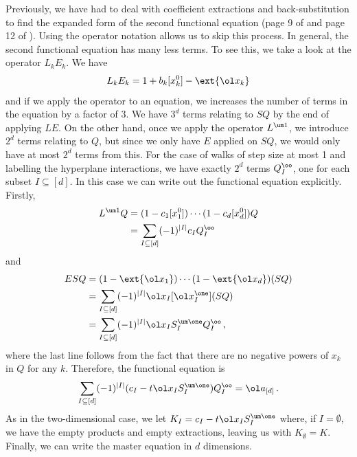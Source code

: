 Previously, we have had to deal with coefficient extractions and back-substitution to find the expanded form of the second functional equation (page 9 of \cite{tabbara2014exact} and page 12 of \cite{wong2014confining}). Using the operator notation allows us to skip this process. In general, the second functional equation has many less terms. To see this, we take a look at the operator $L_kE_k$. We have
\begin{align}
	L_kE_k = 1 + b_k[x_k^0]-\ext{\ol x_k}
\end{align}
and if we apply the operator to an equation, we increases the number of terms in the equation by a factor of 3. We have $3^d$ terms relating to $SQ$ by the end of applying $LE$. On the other hand, once we apply the operator $L^{\um 1}$, we introduce $2^d$ terms relating to $Q$, but since we only have $E$ applied on $SQ$, we would only have at most $2^d$ terms from this. For the case of walks of step size at most 1 and labelling the hyperplane interactions, we have exactly $2^d$ terms $Q_{I}^\oo$, one for each subset $I \subseteq [d]$. In this case we can write out the functional equation explicitly. Firstly,
\begin{align}\begin{split}
	L^{\um 1} Q &= (1-c_1[x_1^0])\cdots(1-c_d[x_d^0])Q \\
	&=  \sum_{I\subseteq [d]} (-1)^{|I|} c_I Q_I^\oo
\end{split}\end{align}
and
\begin{align}\begin{split}
	 ESQ &= (1-\ext{\ol x_1})\cdots(1-\ext{\ol x_d})(SQ) \\
	 &= \sum_{I\subseteq [d]} (-1)^{|I|} \ol x_I [\ol x_I^{\one}](SQ) \\
	 &= \sum_{I\subseteq [d]} (-1)^{|I|} \ol x_I S_I^{\um \one}Q_I^\oo\,,
\end{split}\end{align}
where the last line follows from the fact that there are no negative powers of $x_k$ in $Q$ for any $k$. Therefore, the functional equation is
\begin{align}
    \sum_{I \subseteq [d]}(-1)^{|I|}(c_I-t \ol x_IS_{I}^{\um \one})Q_I^\oo = \ol a_{[d]}\,.
\end{align}
As in the two-dimensional case, we let $K_I = c_I-t \ol x_IS_{I}^{\um \one}$ where, if $I =\emptyset$, we have the empty products and empty extractions, leaving us with $K_{\emptyset} = K$. Finally, we can write the master equation in $d$ dimensions.
